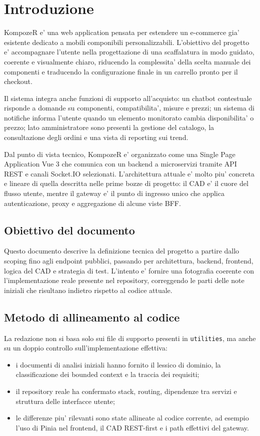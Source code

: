 \chapter{Introduzione}

KompozeR e' una web application pensata per estendere un e-commerce gia' esistente dedicato a mobili componibili personalizzabili. L'obiettivo del progetto e' accompagnare l'utente nella progettazione di una scaffalatura in modo guidato, coerente e visualmente chiaro, riducendo la complessita' della scelta manuale dei componenti e traducendo la configurazione finale in un carrello pronto per il checkout.

Il sistema integra anche funzioni di supporto all'acquisto: un chatbot contestuale risponde a domande su componenti, compatibilita', misure e prezzi; un sistema di notifiche informa l'utente quando un elemento monitorato cambia disponibilita' o prezzo; lato amministratore sono presenti la gestione del catalogo, la consultazione degli ordini e una vista di reporting sui trend.

Dal punto di vista tecnico, KompozeR e' organizzato come una Single Page Application Vue 3 che comunica con un backend a microservizi tramite API REST e canali Socket.IO selezionati. L'architettura attuale e' molto piu' concreta e lineare di quella descritta nelle prime bozze di progetto: il CAD e' il cuore del flusso utente, mentre il gateway e' il punto di ingresso unico che applica autenticazione, proxy e aggregazione di alcune viste BFF.

\section{Obiettivo del documento}

Questo documento descrive la definizione tecnica del progetto a partire dallo scoping fino agli endpoint pubblici, passando per architettura, backend, frontend, logica del CAD e strategia di test. L'intento e' fornire una fotografia coerente con l'implementazione reale presente nel repository, correggendo le parti delle note iniziali che risultano indietro rispetto al codice attuale.

\section{Metodo di allineamento al codice}

La redazione non si basa solo sui file di supporto presenti in \texttt{utilities}, ma anche su un doppio controllo sull'implementazione effettiva:

\begin{itemize}
\item i documenti di analisi iniziali hanno fornito il lessico di dominio, la classificazione dei bounded context e la traccia dei requisiti;
\item il repository reale ha confermato stack, routing, dipendenze tra servizi e struttura delle interfacce utente;
\item le differenze piu' rilevanti sono state allineate al codice corrente, ad esempio l'uso di Pinia nel frontend, il CAD REST-first e i path effettivi del gateway.
\end{itemize}
